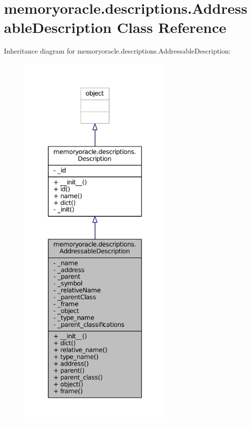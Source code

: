 \hypertarget{classmemoryoracle_1_1descriptions_1_1AddressableDescription}{}\section{memoryoracle.\+descriptions.\+Addressable\+Description Class Reference}
\label{classmemoryoracle_1_1descriptions_1_1AddressableDescription}


Inheritance diagram for memoryoracle.\+descriptions.\+Addressable\+Description\+:\nopagebreak
\begin{figure}[H]
\begin{center}
\leavevmode
\includegraphics[height=550pt]{classmemoryoracle_1_1descriptions_1_1AddressableDescription__inherit__graph}
\end{center}
\end{figure}


